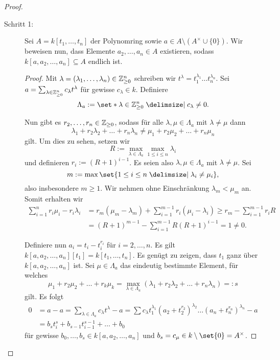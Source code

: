 \documentclass[12pt,a4paper]{scrartcl}
\theoremstyle{cplain}
\theoremstyle{cdef}
\begin{document}
\begin{proof}
	\leavevmode
	\begin{description}
		\item[Schritt 1:] Sei $A = k[t_1,\dots, t_n]$ der Polynomring sowie $a\in A\setminus(A^{\times}\cup \{0\})$. Wir beweisen nun, dass Elemente $a_2,\dots, a_n\in A$ existieren, sodass $k[a, a_2,\dots, a_n]\subseteq A$ endlich ist.
		\begin{proof}
			Mit $\lambda = (\lambda_1,\dots, \lambda_n)\in\mathbb Z_{\ge 0}^n$ schreiben wir $t^{\lambda} = t_1^{\lambda_1}\dots t_n^{\lambda_n}$. Sei $a = \sum_{\lambda\in\mathbb Z_{\ge 0}^n} c_{\lambda}t^{\lambda}$ für gewisse $c_{\lambda}\in k$. Definiere
			\[\Lambda_a := \set*{\lambda\in\IZ_{\ge 0}^n \given c_{\lambda}\neq 0}.\]

			Nun gibt es $r_2,\dots, r_n\in\mathbb Z_{\ge 0}$, sodass für alle $\lambda, \mu\in \Lambda_a$ mit $\lambda\neq \mu$ dann
			\[\lambda_1+r_2\lambda_2+\dots +r_n\lambda_n\neq \mu_1+r_2\mu_2+\dots + r_n\mu_n\]
			gilt. Um dies zu sehen, setzen wir \[R := \max\limits_{\lambda\in\Lambda_a}\max_{1\le i \le n}\lambda _i\] und definieren $r_i := (R+1)^{i-1}$. Es seien also $\lambda,\mu \in \Lambda_a$ mit $\lambda\neq\mu$. Sei \[m := \max\set{1\le i \le n \given \lambda_i \neq \mu_i},\] also insbesondere $m\ge 1$. Wir nehmen ohne Einschränkung $\lambda_m < \mu_m$ an. Somit erhalten wir \begin{align*}
				\sum_{i = 1}^nr_i\mu_i-r_i\lambda_i &= r_m(\mu_m-\lambda_m)+\sum_{i = 1}^{m-1}r_i(\mu_i-\lambda_i)\ge r_m-\sum_{i = 1}^{m-1}r_iR \\ &= (R+1)^{m-1}-\sum_{i = 1}^{m-1} R(R+1)^{i-1} = 1\neq 0.
			\end{align*}
			
			Definiere nun $a_i = t_i-t_i^{r_i}$ für $i = 2, \dots, n$. Es gilt $k[a,a_2,\dots, a_n][t_1] = k[t_1,\dots, t_n]$. Es genügt zu zeigen, dass $t_1$ ganz über $k[a,a_2,\dots, a_n]$ ist. Sei $\mu\in\Lambda_a$ das eindeutig bestimmte Element, für welches
			\[\mu_1+r_2\mu_2+\dots+r_k\mu_k = \max\limits_{\lambda\in\Lambda_a}(\lambda_1+r_2\lambda_2+\dots+r_n\lambda_n) =: s\] gilt.
			Es folgt \begin{align*}
				0 &= a-a = \sum_{\lambda\in\Lambda_a}c_{\lambda}t^{\lambda}-a = \sum c_{\lambda}t_1^{\lambda_1}(a_2+t_2^{r_2})^{\lambda_2}\dots (a_n+t_n^{r_n})^{\lambda_n} -a \\ &= b_st_i^s+b_{s-1}t_{i-1}^{s-1}+\dots +b_0
			\end{align*}
			für gewisse $b_0,\dots, b_s\in k[a, a_2,\dots, a_n]$ und $b_s = c_{\mu} \in k\setminus \set{0} = A^{\times}$.
			

\end{proof}
\end{description}
\end{proof}
\end{document}
